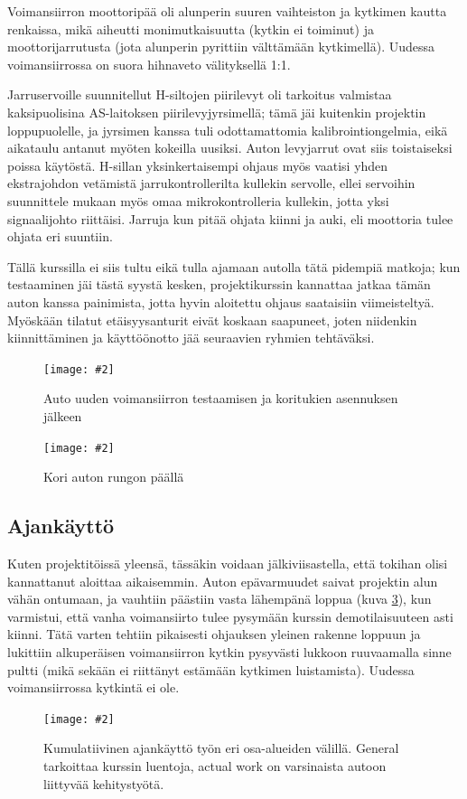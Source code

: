 \documentclass{article}
\newcommand{\kuvaa}[4]{%
	\begin{figure}[h]%
		\centering \texttt{[image: \#2]}%
		\caption{#3 \label{fig:#4}}%
	\end{figure}%
}
\begin{document}
Voimansiirron moottoripää oli alunperin suuren vaihteiston ja kytkimen kautta renkaissa, mikä aiheutti monimutkaisuutta (kytkin ei toiminut) ja moottorijarrutusta (jota alunperin pyrittiin välttämään kytkimellä). Uudessa voimansiirrossa on suora hihnaveto välityksellä 1:1.

Jarruservoille suunnitellut H-siltojen piirilevyt oli tarkoitus valmistaa kaksipuolisina AS-laitoksen piirilevyjyrsimellä; tämä jäi kuitenkin projektin loppupuolelle, ja jyrsimen kanssa tuli odottamattomia kalibrointiongelmia, eikä aikataulu antanut myöten kokeilla uusiksi. Auton levyjarrut ovat siis toistaiseksi poissa käytöstä. H-sillan yksinkertaisempi ohjaus myös vaatisi yhden ekstrajohdon vetämistä jarrukontrollerilta kullekin servolle, ellei servoihin suunnittele mukaan myös omaa mikrokontrolleria kullekin, jotta yksi signaalijohto riittäisi. Jarruja kun pitää ohjata kiinni ja auki, eli moottoria tulee ohjata eri suuntiin.

Tällä kurssilla ei siis tultu eikä tulla ajamaan autolla tätä pidempiä matkoja; kun testaaminen jäi tästä syystä kesken, projektikurssin kannattaa jatkaa tämän auton kanssa painimista, jotta hyvin aloitettu ohjaus saataisiin viimeisteltyä. Myöskään tilatut etäisyysanturit eivät koskaan saapuneet, joten niidenkin kiinnittäminen ja käyttöönotto jää seuraavien ryhmien tehtäväksi.

\kuvaa{0.8}{autoauki}{Auto uuden voimansiirron testaamisen ja koritukien asennuksen jälkeen}{autoauki}
\kuvaa{0.8}{autonkori}{Kori auton rungon päällä}{autonkori}

\subsection{Ajankäyttö}

Kuten projektitöissä yleensä, tässäkin voidaan jälkiviisastella, että tokihan olisi kannattanut aloittaa aikaisemmin. Auton epävarmuudet saivat projektin alun vähän ontumaan, ja vauhtiin päästiin vasta lähempänä loppua (kuva \ref{fig:tyojakauma}), kun varmistui, että vanha voimansiirto tulee pysymään kurssin demotilaisuuteen asti kiinni. Tätä varten tehtiin pikaisesti ohjauksen yleinen rakenne loppuun ja lukittiin alkuperäisen voimansiirron kytkin pysyvästi lukkoon ruuvaamalla sinne pultti (mikä sekään ei riittänyt estämään kytkimen luistamista). Uudessa voimansiirrossa kytkintä ei ole.

\kuvaa{0.8}{jakauma}{Kumulatiivinen ajankäyttö työn eri osa-alueiden välillä. General tarkoittaa kurssin luentoja, actual work on varsinaista autoon liittyvää kehitystyötä.}{tyojakauma}
\end{document}
